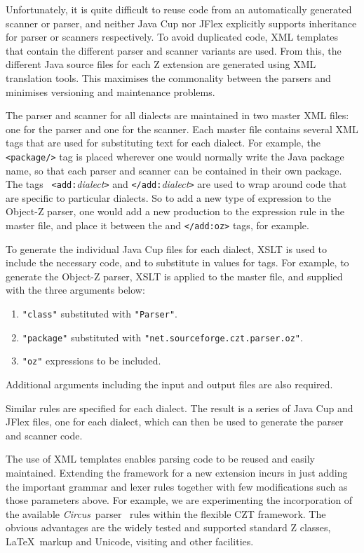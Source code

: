 \documentclass{llncs}
\newcommand{\Circus}{{\sf\slshape Circus}}
\begin{document}
  Unfortunately, it is quite difficult to reuse code from an
  automatically generated scanner or parser, and neither Java Cup nor
  JFlex explicitly supports inheritance for parser or scanners
  respectively.  To avoid duplicated code, XML templates that contain
  the different parser and scanner variants are used. From this, the
  different Java source files for each Z extension are generated using
  XML translation tools.  This maximises the commonality between the
  parsers and minimises versioning and maintenance problems.

The parser and scanner for all dialects are maintained in two master
XML files: one for the parser and one for the scanner. Each master
file contains several XML tags that are used for substituting text for
each dialect. For example, the {\tt <package/>} tag is placed wherever
one would normally write the Java package name, so that each parser
and scanner can be contained in their own package. The tags {\tt
<add:}{\em dialect}{\tt >} and {\tt </add:}{\em dialect}{\tt >} are
used to wrap around code that are specific to particular dialects. So
to add a new type of expression to the Object-Z parser, one would add
a new production to the expression rule in the master file, and place
it between the {\tt <add:oz>} and {\tt </add:oz>} tags, for example.

To generate the individual Java Cup files for each dialect, XSLT is
used to include the necessary code, and to substitute in values for
tags. For example, to generate the Object-Z parser, XSLT is applied to
the master file, and supplied with the three arguments below:
\begin{enumerate}
  \item {\tt "class"} substituted with {\tt "Parser"}.
  \item {\tt "package"} substituted with {\tt "net.sourceforge.czt.parser.oz"}.
  \item {\tt "oz"} expressions to be included.
\end{enumerate}

Additional arguments including the input and output files are also
required.

Similar rules are specified for each dialect. The result is a series
of Java Cup and JFlex files, one for each dialect, which can then be
used to generate the parser and scanner code.

The use of XML templates enables parsing code to be reused and easily maintained.
Extending the framework for a new extension incurs in just adding the important
grammar and lexer rules together with few modifications such as those parameters above.
For example, we are experimenting the incorporation of the available \Circus\
parser~\cite{circus.other:parser} rules within the flexible CZT framework. The
obvious advantages are the widely tested and supported standard Z classes, \LaTeX\
markup and Unicode, visiting and other facilities.
\end{document}
